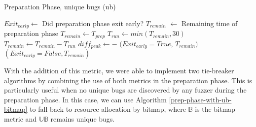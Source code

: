 %
%
\begin{algorithm}[ht!]
  \caption{Preparation Phase, unique bugs (ub)}\label{prep-phase-with-ub}
  \small
  \begin{algorithmic}[1]
    \Output
      \State $Exit_{early} \gets$ Did preparation phase exit early?
      \State $T_{remain}$ $\gets$ Remaining time of preparation phase
    \EndOutput
      \State $T_{remain} \gets T_{prep}$
        \State $T_{run} \gets min(T_{remain},30)$
            \State {}
          \EndFor
        \Else {}
          \State {}
        \EndIf
        \State $T_{remain} \gets T_{remain} - T_{run}$
        \State $diff_{peak} \gets $$ - $
          \State \Return $(Exit_{early}=True$, $T_{remain})$
        \EndIf
      \EndWhile
      \State \Return $(Exit_{early}=False, T_{remain})$
    \EndFunction
  \end{algorithmic}
\end{algorithm}

With the addition of this metric, we were able to implement two tie-breaker algorithms 
by combining the use of both metrics in the preparation phase. This is particularly 
useful when no unique bugs are discovered by any fuzzer during the preparation phase. 
In this case, we can use Algorithm \ref{prep-phase-with-ub-bitmap} to fall back to 
resource allocation by bitmap, where $\mathbb{B}$ is the bitmap metric and $\mathbb{UB}$ 
remains unique bugs.

